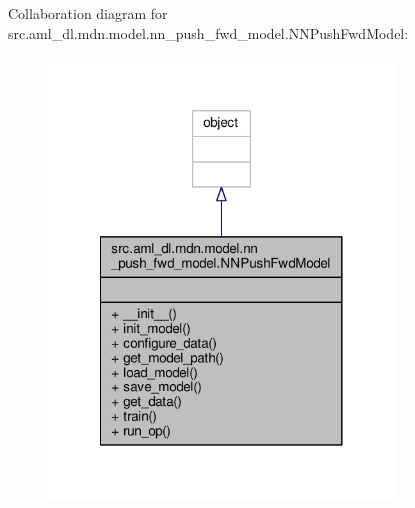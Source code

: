 Collaboration diagram for src.\-aml\-\_\-dl.\-mdn.\-model.\-nn\-\_\-push\-\_\-fwd\-\_\-model.\-N\-N\-Push\-Fwd\-Model\-:
\nopagebreak
\begin{figure}[H]
\begin{center}
\leavevmode
\includegraphics[width=260pt]{classsrc_1_1aml__dl_1_1mdn_1_1model_1_1nn__push__fwd__model_1_1_n_n_push_fwd_model__coll__graph}
\end{center}
\end{figure}
